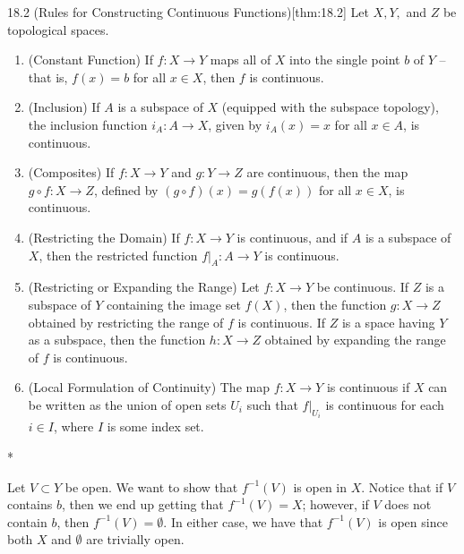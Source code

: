 \begin{thmBox}{18.2 (Rules for Constructing Continuous Functions)}[thm:18.2]
    Let \( X, Y, \) and \( Z \) be topological spaces.
    \begin{enumerate}[label = (\alph*)]
        \item (Constant Function) If \( f: X \rightarrow Y \) maps all of 
            \( X \) into the single point \( b \) of \( Y \) -- that is, 
            \( f ( x ) = b \) for all \( x \in X \), then \( f \) is continuous.
        \item (Inclusion) If \( A \) is a subspace of \( X \) (equipped with 
            the subspace topology), the inclusion
            function \( i_{ A }: A \rightarrow X \), given by 
            \( i_{ A } ( x ) = x \) for all \( x \in A \), is continuous.
        \item (Composites) If \( f: X \rightarrow Y \) and 
            \( g: Y \rightarrow Z \) are continuous, then the map
            \( g \circ f: X \rightarrow Z \), defined by \( ( g \circ f ) ( x )
            = g ( f( x ) ) \) for all \( x \in X \), is continuous.
        \item (Restricting the Domain) If \( f: X \rightarrow Y \) is 
            continuous, and if \( A \) is a subspace of \( X \), then the 
            restricted function \( f \vert_{ A }: A \rightarrow Y \) is 
            continuous.
        \item (Restricting or Expanding the Range) Let \( f: X \rightarrow Y \)
            be continuous. If \( Z \) is a subspace of \( Y \) containing the 
            image set \( f ( X ) \), then the function \( g: X \rightarrow Z \)
            obtained by restricting the range of \( f \) is continuous.
            If \( Z \) is a space having \( Y \) as a subspace, then the 
            function \( h: X \rightarrow Z \) obtained by expanding the range of
            \( f \) is continuous.
        \item (Local Formulation of Continuity) The map \( f: X \rightarrow Y \)
            is continuous if \( X \) can be written as the union of open sets 
            \( U_{ i } \) such that \( f \vert_{ U_{ i } } \) is continuous for 
            each \( i \in I \), where \( I \) is some index set.
    \end{enumerate}

    \baseRule

    \begin{proofBox}*

        Let \( V \subset Y \) be open. 
        We want to show that \( f^{ -1 } ( V ) \) is open in \( X \). 
        Notice that if \( V \) contains \( b \), then we end up getting that 
        \( f^{ -1 } ( V ) = X \); however, if \( V \) does not contain \( b \), 
        then \( f^{ -1 } ( V ) = \emptyset \).
        In either case, we have that \( f^{ -1 } ( V ) \) is open since both 
        \( X \) and \( \emptyset \) are trivially open.
        

\end{proofBox}
\end{thmBox}
